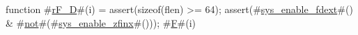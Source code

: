 function #\hyperref[sailRISCVzrFzyD]{rF\_D}#(i) = {
  assert(sizeof(flen) >= 64);
  assert(#\hyperref[sailRISCVzsyszyenablezyfdext]{sys\_enable\_fdext}#() & #\hyperref[sailRISCVznot]{not}#(#\hyperref[sailRISCVzsyszyenablezyzzfinx]{sys\_enable\_zfinx}#()));
  #\hyperref[sailRISCVzF]{F}#(i)
}
